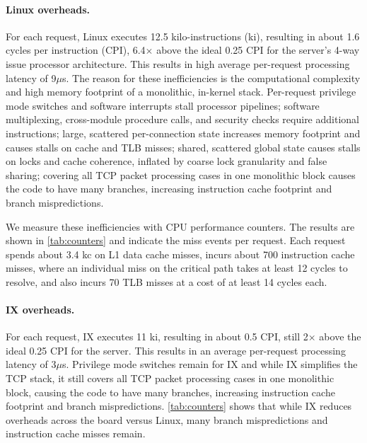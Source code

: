 \paragraph{Linux overheads.} For each request, Linux executes 12.5
kilo-instructions (ki), resulting in about 1.6 cycles per instruction
(CPI), 6.4$\times$ above the ideal 0.25 CPI for the server's 4-way
issue processor architecture. This results in high average per-request
processing latency of 9$\mu$s. The reason for these inefficiencies is
the computational complexity and high memory footprint of a
monolithic, in-kernel stack. Per-request privilege mode switches and
software interrupts stall processor pipelines; software multiplexing,
cross-module procedure calls, and security checks require additional
instructions; large, scattered per-connection state increases memory
footprint and causes stalls on cache and TLB misses; shared, scattered
global state causes stalls on locks and cache coherence, inflated by
coarse lock granularity and false sharing; covering all TCP packet
processing cases in one monolithic block causes the code to have many
branches, increasing instruction cache footprint and branch
mispredictions.

We measure these inefficiencies with CPU performance counters. The
results are shown in \autoref{tab:counters} and indicate the miss
events per request. Each request spends about 3.4 kc on L1 data cache
misses, incurs about 700 instruction cache misses, where an individual
miss on the critical path takes at least 12 cycles to resolve, and
also incurs 70 TLB misses at a cost of at least 14 cycles
each.%

\paragraph{IX overheads.} For each request, IX executes 11 ki,
resulting in about 0.5 CPI, still 2$\times$ above the ideal 0.25 CPI
for the server. This results in an average per-request processing
latency of 3$\mu$s. Privilege mode switches remain for IX and while IX
simplifies the TCP stack, it still covers all TCP packet processing
cases in one monolithic block, causing the code to have many branches,
increasing instruction cache footprint and branch
mispredictions. \autoref{tab:counters} shows that while IX reduces
overheads across the board versus Linux, many branch mispredictions
and instruction cache misses remain.

